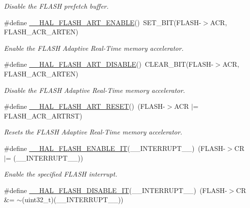 \begin{DoxyCompactItemize}
\begin{DoxyCompactList}\small\item\em Disable the F\+L\+A\+SH prefetch buffer. \end{DoxyCompactList}\item 
\#define \mbox{\hyperlink{group___f_l_a_s_h___exported___macros_ga7e6732b18da40e812f8752a01bb90ba8}{\+\_\+\+\_\+\+H\+A\+L\+\_\+\+F\+L\+A\+S\+H\+\_\+\+A\+R\+T\+\_\+\+E\+N\+A\+B\+LE}}()~S\+E\+T\+\_\+\+B\+IT(F\+L\+A\+SH-\/$>$A\+CR, F\+L\+A\+S\+H\+\_\+\+A\+C\+R\+\_\+\+A\+R\+T\+EN)
\begin{DoxyCompactList}\small\item\em Enable the F\+L\+A\+SH Adaptive Real-\/\+Time memory accelerator. \end{DoxyCompactList}\item 
\#define \mbox{\hyperlink{group___f_l_a_s_h___exported___macros_ga2bad63029bd87a1e17d8147f38334630}{\+\_\+\+\_\+\+H\+A\+L\+\_\+\+F\+L\+A\+S\+H\+\_\+\+A\+R\+T\+\_\+\+D\+I\+S\+A\+B\+LE}}()~C\+L\+E\+A\+R\+\_\+\+B\+IT(F\+L\+A\+SH-\/$>$A\+CR, F\+L\+A\+S\+H\+\_\+\+A\+C\+R\+\_\+\+A\+R\+T\+EN)
\begin{DoxyCompactList}\small\item\em Disable the F\+L\+A\+SH Adaptive Real-\/\+Time memory accelerator. \end{DoxyCompactList}\item 
\#define \mbox{\hyperlink{group___f_l_a_s_h___exported___macros_ga8e4aa25abddb55a36d78628772308577}{\+\_\+\+\_\+\+H\+A\+L\+\_\+\+F\+L\+A\+S\+H\+\_\+\+A\+R\+T\+\_\+\+R\+E\+S\+ET}}()~(F\+L\+A\+SH-\/$>$A\+CR $\vert$= F\+L\+A\+S\+H\+\_\+\+A\+C\+R\+\_\+\+A\+R\+T\+R\+ST)
\begin{DoxyCompactList}\small\item\em Resets the F\+L\+A\+SH Adaptive Real-\/\+Time memory accelerator. \end{DoxyCompactList}\item 
\#define \mbox{\hyperlink{group___f_l_a_s_h___exported___macros_ga13fa137a911f02a2f94fb9fb0762a340}{\+\_\+\+\_\+\+H\+A\+L\+\_\+\+F\+L\+A\+S\+H\+\_\+\+E\+N\+A\+B\+L\+E\+\_\+\+IT}}(\+\_\+\+\_\+\+I\+N\+T\+E\+R\+R\+U\+P\+T\+\_\+\+\_\+)~(F\+L\+A\+SH-\/$>$CR $\vert$= (\+\_\+\+\_\+\+I\+N\+T\+E\+R\+R\+U\+P\+T\+\_\+\+\_\+))
\begin{DoxyCompactList}\small\item\em Enable the specified F\+L\+A\+SH interrupt. \end{DoxyCompactList}\item 
\#define \mbox{\hyperlink{group___f_l_a_s_h___exported___macros_ga1f40f507b5d4b3a4da68e4244a1097ee}{\+\_\+\+\_\+\+H\+A\+L\+\_\+\+F\+L\+A\+S\+H\+\_\+\+D\+I\+S\+A\+B\+L\+E\+\_\+\+IT}}(\+\_\+\+\_\+\+I\+N\+T\+E\+R\+R\+U\+P\+T\+\_\+\+\_\+)~(F\+L\+A\+SH-\/$>$CR \&= $\sim$(uint32\+\_\+t)(\+\_\+\+\_\+\+I\+N\+T\+E\+R\+R\+U\+P\+T\+\_\+\+\_\+))

\end{DoxyCompactItemize}
